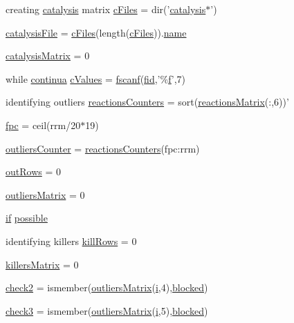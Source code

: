 \begin{DoxyCompactItemize}
\item 
creating \hyperlink{a00012}{catalysis} matrix \hyperlink{a00030_a9eab57ccb42a39c704f47dc30e4f4515}{c\-Files} = dir('\hyperlink{a00012}{catalysis}$\ast$')
\item 
\hyperlink{a00030_a33e70cf5b45cb59005b82d30202f0b69}{catalysis\-File} = \hyperlink{a00030_a9eab57ccb42a39c704f47dc30e4f4515}{c\-Files}(length(\hyperlink{a00030_a9eab57ccb42a39c704f47dc30e4f4515}{c\-Files})).\hyperlink{a00027_abbf559a76fab59203496b0847ab9502a}{name}
\item 
\hyperlink{a00030_a0810027f58d6be965e44b7b84c44ace8}{catalysis\-Matrix} = 0
\item 
while \hyperlink{a00030_a9c951ebd5bc3f1adce943bee1255f4d6}{continua} \hyperlink{a00030_ad4ba7701967c1da20171228afccb7081}{c\-Values} = \hyperlink{a00025_a028ac102a731e62fb0a7439381f566c1}{fscanf}(\hyperlink{a00031_ae9011d40c6f13e68e6f07156e0da7c5d}{fid},'\%\hyperlink{a00025_a9c5a71c46b1abb8b7df5ebeac6c81535}{f}',7)
\item 
identifying outliers \hyperlink{a00030_aeea253cb98a56047ef20ceed86e2f0ea}{reactions\-Counters} = sort(\hyperlink{a00030_af998036b749d9fa6dd2365f9937279b6}{reactions\-Matrix}(\-:,6))'
\item 
\hyperlink{a00030_ab4459bcd3f7a26410560d9bd951f12bd}{fpc} = ceil(rrm/20$\ast$19)
\item 
\hyperlink{a00030_a7ec5b1f1e07b66a5d6fc972cb8b03c1f}{outliers\-Counter} = \hyperlink{a00030_aeea253cb98a56047ef20ceed86e2f0ea}{reactions\-Counters}(fpc\-:rrm)
\item 
\hyperlink{a00030_a60cfb1ca20cbbc81b85a8f56658b7c99}{out\-Rows} = 0
\item 
\hyperlink{a00030_ad8a18b407726bf44299c9bcf5d1389ff}{outliers\-Matrix} = 0
\item 
\hyperlink{a00030_a01d55766b8058903dd360b4bda71f9f5}{if} \hyperlink{a00030_a07c9e68cdbafe572c04d3112d64deb88}{possible}
\item 
identifying killers \hyperlink{a00030_a0e22d9868b850c50dfc13f5d28db8c30}{kill\-Rows} = 0
\item 
\hyperlink{a00030_a929016802e1ede2217a41240a6974fa6}{killers\-Matrix} = 0
\item 
\hyperlink{a00030_a98a8838a85ed24032563a44271b1525a}{check2} = ismember(\hyperlink{a00030_a9733b61dd859b1133aa3aa849cf70cbc}{outliers\-Matrix}(\hyperlink{a00113_ad3efca1ea6e3333daf30719ee0501862}{i},4),\hyperlink{a00030_a1faaaae288fc8ca4ed1751049aa2f84f}{blocked})
\item 
\hyperlink{a00030_adfd17509248a56986475a25ee50fe488}{check3} = ismember(\hyperlink{a00030_a9733b61dd859b1133aa3aa849cf70cbc}{outliers\-Matrix}(\hyperlink{a00113_ad3efca1ea6e3333daf30719ee0501862}{i},5),\hyperlink{a00030_a1faaaae288fc8ca4ed1751049aa2f84f}{blocked})

\end{DoxyCompactItemize}
